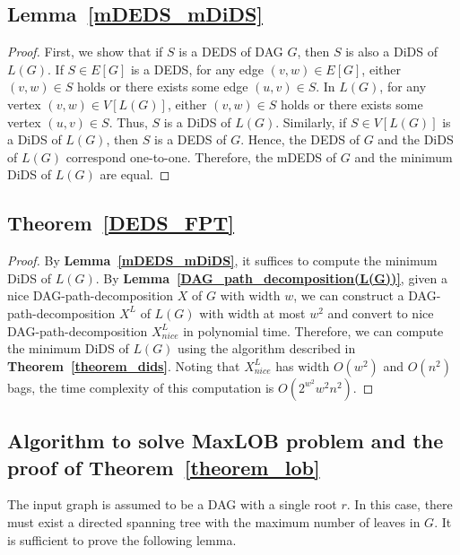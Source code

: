 \documentclass[runningheads]{llncs}
\theoremstyle{plain}
\theoremstyle{definition}
\begin{document}
\subsection{\textbf{Lemma~\ref{mDEDS_mDiDS}}}\label{appendix_B2}
\begin{proof}
    First, we show that if $S$ is a DEDS of DAG $G$, then $S$ is also a DiDS of $L(G)$. If $S\in E[G]$ is a DEDS, for any edge $(v, w) \in E[G]$, either $(v, w) \in S$ holds or there exists some edge $(u, v) \in S$. In $L(G)$, for any vertex $(v, w) \in V[L(G)]$, either $(v, w) \in S$ holds or there exists some vertex $(u, v) \in S$. Thus, $S$ is a DiDS of $L(G)$. Similarly, if $S \in V[L(G)]$ is a DiDS of $L(G)$, then $S$ is a DEDS of $G$. Hence, the DEDS of $G$ and the DiDS of $L(G)$ correspond one-to-one. Therefore, the mDEDS of $G$ and the minimum DiDS of $L(G)$ are equal.
\end{proof}


\subsection{\textbf{Theorem~\ref{DEDS_FPT}}}\label{appendix_B3}
\begin{proof}
    By \textbf{Lemma~\ref{mDEDS_mDiDS}}, it suffices to compute the minimum DiDS of $L(G)$. By \textbf{Lemma~\ref{DAG_path_decomposition(L(G))}}, given a nice DAG-path-decomposition $X$ of $G$ with width $w$, we can construct a DAG-path-decomposition $X^L$ of $L(G)$ with width at most $w^2$ and convert to nice DAG-path-decomposition $X^L_{nice}$ in polynomial time. Therefore, we can compute the minimum DiDS of $L(G)$ using the algorithm described in \textbf{Theorem~\ref{theorem_dids}}. Noting that $X^L_{nice}$ has width $O(w^2)$ and $O(n^2)$ bags, the time complexity of this computation is $O(2^{w^2}w^2n^2)$.
\end{proof}












\subsection{Algorithm to solve MaxLOB problem and the proof of \textbf{Theorem~\ref{theorem_lob}}}\label{appendix_B5}

The input graph is assumed to be a DAG with a single root $r$. In this case, there must exist a directed spanning tree with the maximum number of leaves in $G$. It is sufficient to prove the following lemma.
\end{document}
